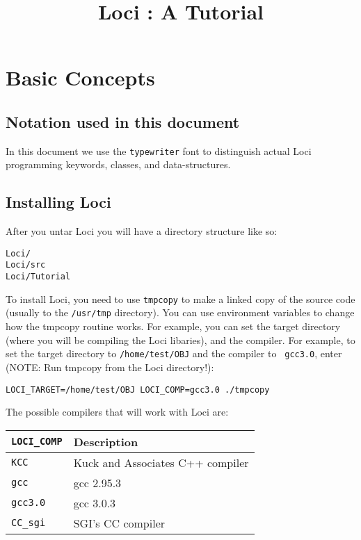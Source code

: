 \documentclass[10pt,epsf]{book}
\title { Loci : A Tutorial }
\begin{document}
\maketitle
%

\chapter{ Basic Concepts }

\section{Notation used in this document}

In this document we use the {\tt typewriter} font to distinguish
actual Loci programming keywords, classes, and data-structures.

\section{ Installing Loci}

After you untar Loci you will have a directory structure like so:

\begin{verbatim}
Loci/
Loci/src
Loci/Tutorial
\end{verbatim}

To install Loci, you need to use {\tt tmpcopy} to make a linked copy
of the source code (usually to the {\tt /usr/tmp} directory).  You
can use environment variables to change how the tmpcopy routine works.
For example, you can set the target directory (where you will be
compiling the Loci libaries), and the compiler.  For example, to set
the target directory to {\tt /home/test/OBJ} and the compiler to {\tt
  gcc3.0}, enter (NOTE: Run tmpcopy from the Loci directory!):

\begin{verbatim}
LOCI_TARGET=/home/test/OBJ LOCI_COMP=gcc3.0 ./tmpcopy
\end{verbatim}

The possible compilers that will work with Loci are:  

\begin{center}
\begin{tabular}{|l|l|}
\hline
{\tt LOCI\_COMP} & Description \\
\hline
\hline
{\tt KCC }      & Kuck and Associates C++ compiler \\
{\tt gcc }      & gcc 2.95.3 \\
{\tt gcc3.0}    & gcc 3.0.3 \\
{\tt CC\_sgi}    & SGI's CC compiler \\
\hline
\end{tabular}
\end{center}
\end{document}
